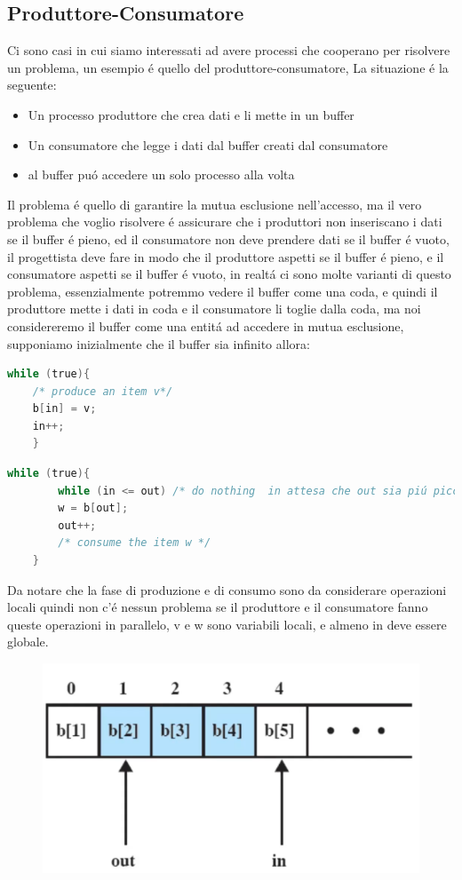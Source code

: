 \subsection{Produttore-Consumatore}
Ci sono casi in cui siamo interessati ad avere processi che cooperano per risolvere un problema, un esempio é quello del produttore-consumatore,
La situazione é la seguente:
\begin{itemize}
    \item Un processo produttore che crea dati e li mette in un buffer
    \item Un consumatore che legge i dati dal buffer creati dal consumatore
    \item al buffer puó accedere un solo processo alla volta
\end{itemize}
Il problema é quello di garantire la mutua esclusione nell'accesso, ma il vero problema che voglio risolvere é assicurare che
i produttori non inseriscano i dati se il buffer é pieno, ed il consumatore non deve prendere dati se il buffer é vuoto, il progettista
deve fare in modo che il produttore aspetti se il buffer é pieno, e il consumatore aspetti se il buffer é vuoto, in realtá ci sono molte
varianti di questo problema, essenzialmente potremmo vedere il buffer come una coda, e quindi il produttore mette i dati in coda e il consumatore
li toglie dalla coda, ma noi considereremo il buffer come una entitá ad accedere in mutua esclusione, supponiamo inizialmente che il buffer
sia infinito allora:
\begin{lstlisting}[language=C]
    while (true){
    /* produce an item v*/
    b[in] = v;
    in++;
    }
\end{lstlisting}
\begin{lstlisting}[language=C]
    while (true){
        while (in <= out) /* do nothing  in attesa che out sia piú piccolo di in*/;
        w = b[out];
        out++;
        /* consume the item w */
    }
\end{lstlisting}
Da notare che la fase di produzione e di consumo sono da considerare operazioni locali quindi non c'é nessun problema se
il produttore e il consumatore fanno queste operazioni in parallelo, v e w sono variabili locali, e almeno in deve essere globale.
\begin{figure}[H]
    \centering
    \includegraphics[width=0.7\linewidth]{immagini/ProduttoreConsumatoreBuffer}
\end{figure}
